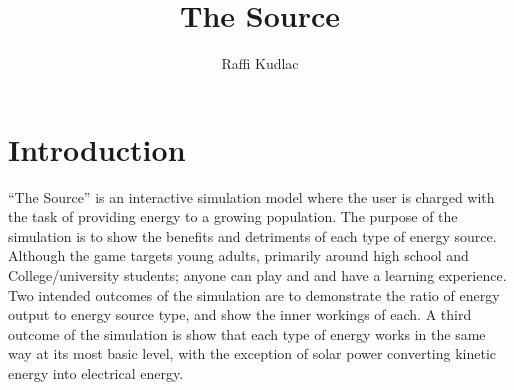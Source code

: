 \documentclass[msc,oneside]{ubcthesis}%
\title{The Source}
\author{Raffi Kudlac} %
\begin{document}
\frontmatter                    %

\maketitle                      %

\newpage
{} \label{tableofcontent}%
\tableofcontents                %
\newpage 
{} \label{listoftab}%
\listoftables                   %
\newpage
{} \label{listoffig}%
\listoffigures                  %


\mainmatter


\chapter{Introduction}
	“The Source” is an interactive simulation model where the user is charged with the task of providing 
energy to a growing population. The purpose of the simulation is to show the benefits and detriments of 
each type of energy source. Although the game targets young adults, primarily around high school and 
College/university students; anyone can play and and have a learning experience. Two intended outcomes of 
the simulation are to demonstrate the ratio of energy output to energy source type, and show the inner 
workings of each. A third outcome of the simulation is show that each type of energy works in the same way 
at its most basic level, with the exception of solar power converting kinetic energy into electrical energy.
\bigskip
\end{document}
